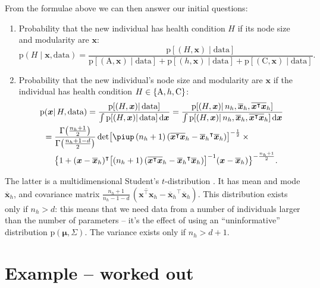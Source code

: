 \documentclass[\ifafour a4paper,12pt,\else a5paper,10pt,\fi%
onecolumn,oneside,article,%
british%
]{memoir}
\theoremstyle{remark}
\theoremstyle{innote}
\renewcommand*{\cites}{\parencites}
\newcommand*{\pu}{\piup}%
\newcommand*{\di}{\mathrm{d}}%
\DeclarePairedDelimiter\set{\{}{\}}
\newcommand*{\pf}{\mathrm{p}}%
\renewcommand*{\|}{\mathpunct{|}}
\newcommand*{\sect}{\S}%
\newcommand*{\sects}{\S\S}%
\newcommand*{\chap}{ch.}%
\newcommand*{\T}{^\intercal}%
\newcommand*{\yH}{H}
\newcommand*{\yh}{h}
\newcommand*{\yx}{x}
\newcommand*{\yxx}{\bm{\yx}}
\newcommand*{\data}{\text{data}}
\newcommand*{\ya}{\mathrm{A}}
\newcommand*{\yi}{\mathrm{C}}
\newcommand*{\ym}{\mu}
\newcommand*{\ymm}{\bm{\ym}}
\newcommand*{\ys}{\varSigma}
\newcommand*{\yss}{\bm{\ys}}
\newcommand*{\yN}{N}
\newcommand*{\yq}{\pf}
\newcommand*{\yn}{n}
\newcommand*{\yd}{d}
\newcommand*{\yno}{\yn_{\yh}}
\newcommand*{\vxxo}{\overline{\yxx}_{\yh}}
\newcommand*{\vxto}{\overline{\yxx\T\yxx}_{\yh}}
\theoremstyle{plain}
\begin{document}
\bigskip

From the formulae above we can then answer our initial questions:
\begin{enumerate}[wide]
\item Probability that the new individual has health condition $\yH$ if
  its node size and modularity are $\yxx$:
  \begin{equation}
    \label{eq:health_from_fmri_final}
    \pf(\yH \| \yxx, \data)=
    \frac{\pf[(\yH,\yxx) \| \data]
    }{
      \pf[(\ya,\yxx) \| \data]
      +\pf[(\yh,\yxx) \| \data]
      +\pf[(\yi,\yxx) \| \data]
    }.
  \end{equation}
\item Probability that the new individual's node size and modularity are $\yxx$
  if the individual has health condition $\yH\in\set{\ya,\yh,\yi}$:
\begin{multline}
  \label{eq:fmri_from_health_final}
    \pf(\yxx \| \yH, \data)= \frac{\pf[(\yH,\yxx) \| \data]
    }{\int\pf[(\yH,\yxx) \| \data]\,\di\yxx}
    =\frac{\pf[(\yH,\yxx) \| \yno,\vxxo,\vxto]
    }{\int\pf[(\yH,\yxx) \|  \yno,\vxxo,\vxto]\,\di\yxx}
  \\
  =
  \!\begin{aligned}[t]
    &\frac{\Gamma\bigl(\frac{\yno+1}{2}\bigr)
    }{\Gamma\bigl(\frac{\yno+1-\yd}{2}\bigr)} \det\bigl[
    \pu\,(\yno+1)\,(\vxto-{\vxxo}\T\vxxo) \bigr]^{-\frac{1}{2}}
    \times{}\\
    &\bigl\{ 1+(\yxx-\vxxo)\T\bigl[
    (\yno+1)\,(\vxto-{\vxxo}\T\vxxo) \bigr]^{-1} (\yxx-\vxxo)
    \bigr\}^{-\frac{\yno+1}{2}}.
  \end{aligned}
  \end{multline}
\end{enumerate}
The latter is a multidimensional Student's $t$-distribution
\cites[\sects~5,
A]{minka1998_r2001}[\chap~4]{guptaetal2000}[\sect~2.5.3]{murphy2012}[p.~139]{bernardoetal1994_r2000}[\sect~2.3.7]{bishop2006}[\sect~5.6]{degroot1970_r2004}.
It has mean and mode $\vxxo$, and covariance matrix
$\frac{\yno+1}{\yno-1-\yd}\,(\vxto-{\vxxo}\T\vxxo)$. This
distribution exists only if $\yno>\yd$: this means that we need data from a
number of individuals larger than the number of parameters -- it's the
effect of using an \enquote{uninformative} distribution $\yq(\ymm,\yss)$.
The variance exists only if $\yno>\yd+1$.



\section{Example -- worked out}
\label{sec:example_worked}
\end{document}
